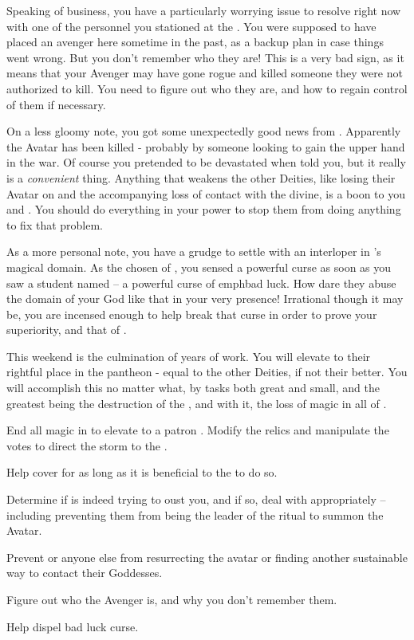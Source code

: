 \documentclass[char]{GL2020}
\begin{document}
Speaking of \pGoaties{} business, you have a particularly worrying issue to resolve right now with one of the personnel you stationed at the \pSc{}. You were supposed to have placed an avenger here sometime in the past, as a backup plan in case things went wrong. But you don’t remember who they are! This is a very bad sign, as it means that your Avenger may have gone rogue and killed someone they were not authorized to kill. You need to figure out who they are, and how to regain control of them if necessary.

On a less gloomy note, you got some unexpectedly good news from \cEbbPriest{}. Apparently the \cEbb{} Avatar has been killed - probably by someone looking to gain the upper hand in the war. Of course you pretended to be devastated when \cEbbPriest{\they} told you, but it really is a \emph{convenient} thing. Anything that weakens the other Deities, like losing their Avatar on \pEarth{} and the accompanying loss of contact with the divine, is a boon to you and \cGenesis{}. You should do everything in your power to stop them from doing anything to fix that problem.

As a more personal note, you have a grudge to settle with an interloper in \cGenesis{}’s magical domain. As the chosen of \cGenesis{}, you sensed a powerful curse as soon as you saw a student named \cInitiate{} -- a powerful curse of emph{bad luck}. How dare they abuse the domain of your God like that in your very presence! Irrational though it may be, you are incensed enough to help \cInitiate{} break that curse in order to prove your superiority, and that of \cGenesis{}.

This weekend is the culmination of years of work. You will elevate \cGenesis{} to their rightful place in the pantheon - equal to the other Deities, if not their better. You will accomplish this no matter what, by tasks both great and small, and the greatest being the destruction of the \pSchool{}, and with it, the loss of magic in all of \pEarth{}.

\begin{itemz}[Goals]
	\item End all magic in \pEarth{} to elevate \cGenesis{} to a patron \cGenesis{\God}. Modify the relics and manipulate the votes to direct the storm to the \pSc{}.
	\item Help \cChupInventor{} cover for \cHeadScientist{} as long as it is beneficial to the \pGoaties{} to do so.
	\item Determine if \cChupSecond{} is indeed trying to oust you, and if so, deal with \cChupSecond{\them} appropriately -- including preventing them from being the leader of the ritual to summon the Avatar.
	\item Prevent \cEbbPriest{} or anyone else from resurrecting the \cEbb{} avatar or finding another sustainable way to contact their Goddesses.
	\item Figure out who the Avenger is, and why you don’t remember them.
\item Help \cInitiate{} dispel \cInitiate{\their} bad luck curse.
\end{itemz}
\end{document}
